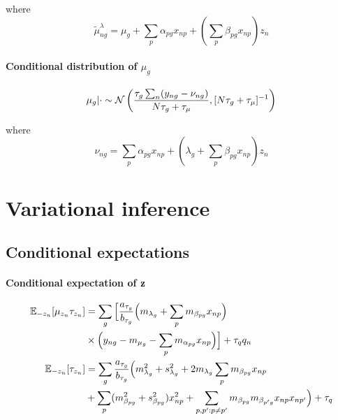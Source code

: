 where
\begin{equation}
\tilde{\mu}^\lambda_{ng} = \mu_g + \sum_p \alpha_{pg} x_{np} + \left( \sum_p \beta_{pg} x_{np} \right) z_n
\end{equation}

\paragraph{Conditional distribution of $\mu_g$}
\begin{equation}
\mu_g | \cdot \sim \mathcal{N}\left(
\frac{\tau_g \sum_n(y_{ng} - \nu_{ng})}{N \tau_g + \tau_\mu}, [N \tau_g + \tau_\mu]^{-1}
\right)
\end{equation}

where
\begin{equation}
\nu_{ng} = \sum_p \alpha_{pg} x_{np} + \left( \lambda_g + \sum_p \beta_{pg} x_{np} \right) z_n
\end{equation}



\section{Variational inference} \label{app:clvm_vi}

\subsection{Conditional expectations}


\paragraph{Conditional expectation of $\mathbf{z}$}
\begin{equation}
\begin{aligned}
\mathbb{E}_{-z_n}[\mu_{z_n}\tau_{z_n}] & = \sum_g \Big[ \frac{a_{\tau_g}}{b_{\tau_g}}
\Big( m_{\lambda_g} + \sum_p m_{\beta_{pg}} x_{np} \Big) \\
& \times \Big( y_{ng} - m_{\mu_g} - \sum_p m_{\alpha_{pg}} x_{np} \Big)
\Big] + \tau_q q_n \\
\mathbb{E}_{-z_n} [\tau_{z_n}] & = \sum_g \frac{a_{\tau_g}}{b_{\tau_g}}
 \Big(m_{\lambda_g}^2 + s_{\lambda_g}^2 + 2m_{\lambda_g} \sum_p m_{\beta_{pg}} x_{np} \\
 & + \sum_p (m_{\beta_{pg}}^2 + s_{\beta_{pg}}^2) x_{np}^2 +
 \sum_{p,p': p \neq p'} m_{\beta_{pg}} m_{\beta_{p'g}} x_{np}x_{np'}
\Big) + \tau_q
\end{aligned}
\end{equation}

